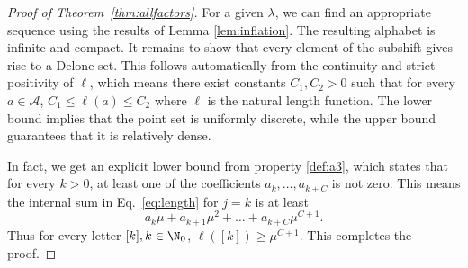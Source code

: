 \begin{proof}[Proof of Theorem~\textnormal{\ref{thm:allfactors}}]
For a given $\lambda$, we can find an appropriate sequence using the results of Lemma \ref{lem:inflation}. The resulting alphabet is infinite and compact. It remains to show that every element of the subshift gives rise to a Delone set. This follows automatically from the continuity and strict positivity of $\ell$, which means there exist constants $C_1,C_2>0$ such that for every $a\in \mathcal{A}$, $C_1\leq \ell(a)\leq C_2$ where $\ell$ is the natural length function. The lower bound implies that the point set is uniformly discrete, while the upper bound guarantees that it is relatively dense. 

%


In fact, we get an explicit lower bound from  property \ref{def:a3}, which states that for every $k>0$, at least one of the coefficients $a_k,\ldots,a_{k+C}$ is not zero. This means the internal sum in Eq.~\eqref{eq:length} for $j=k$ is at least 
$$a_k\mu+a_{k+1}\mu^2+\ldots+a_{k+C}\mu^{C+1}.$$
Thus for every letter $[k], k\in\N_0$, $\ell([k])\geq \mu^{C+1}$. 
This completes the proof.
\end{proof}
